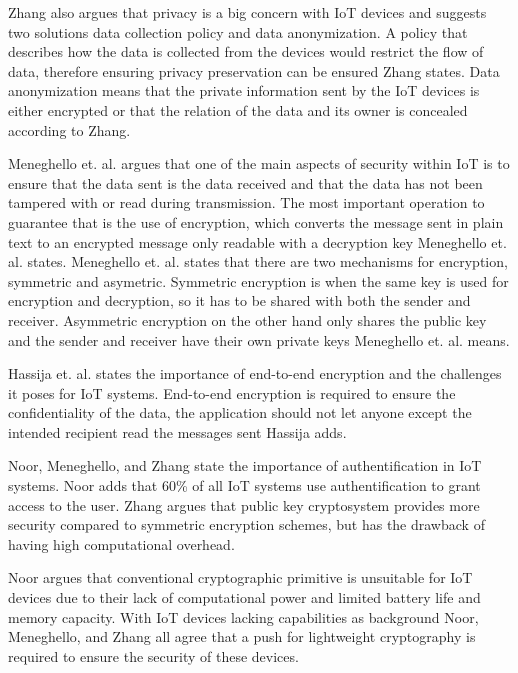 Zhang also argues that privacy is a big concern with IoT devices and suggests two solutions data collection policy and data anonymization.
A policy that describes how the data is collected from the devices would restrict the flow of data, therefore ensuring privacy preservation can be ensured Zhang states.
Data anonymization means that the private information sent by the IoT devices is either encrypted or that the relation of the data and its owner is concealed according to Zhang.\cite{Zhang2014}

Meneghello et. al. argues that one of the main aspects of security within IoT is to ensure that the data sent is the data received and that the data has not been tampered with or read during transmission.
The most important operation to guarantee that is the use of encryption, which converts the message sent in plain text to an encrypted message only readable with a decryption key Meneghello et. al. states.
Meneghello et. al. states that there are two mechanisms for encryption, symmetric and asymetric.
Symmetric encryption is when the same key is used for encryption and decryption, so it has to be shared with both the sender and receiver.
Asymmetric encryption on the other hand only shares the public key and the sender and receiver have their own private keys Meneghello et. al. means.\cite{Meneghello2019}

Hassija et. al. states the importance of end-to-end encryption and the challenges it poses for IoT systems.
End-to-end encryption is required to ensure the confidentiality of the data, the application should not let anyone except the intended recipient read the messages sent Hassija adds.\cite{Hassija2019}

Noor, Meneghello, and Zhang state the importance of authentification in IoT systems.\cite{Noor2019,Meneghello2019,Zhang2014} 
Noor adds that 60\% of all IoT systems use authentification to grant access to the user.\cite{Noor2019}  
Zhang argues that public key cryptosystem provides more security compared to symmetric encryption schemes, but has the drawback of having high computational overhead.\cite{Zhang2014} 

Noor argues that conventional cryptographic primitive is unsuitable for IoT devices due to their lack of computational power and limited battery life and memory capacity.\cite{Noor2019}
With IoT devices lacking capabilities as background Noor, Meneghello, and Zhang all agree that a push for lightweight cryptography is required to ensure the security of these devices.\cite {Noor2019,Meneghello2019,Zhang2014} 

